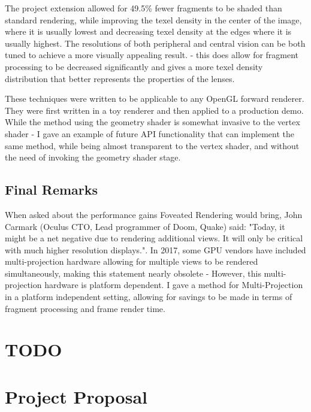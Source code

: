 \documentclass[12pt,a4paper,twoside,openright]{report}
\begin{document}
The project extension allowed for 49.5\% fewer fragments to be shaded than standard rendering, while improving the texel density in the center of the image, where it is usually lowest and decreasing texel density at the edges where it is usually highest. The resolutions of both peripheral and central vision can be both tuned to achieve a more visually appealing result. - this does allow for fragment processing to be decreased significantly and gives a more texel density distribution that better represents the properties of the lenses. \par

These techniques were written to be applicable to any OpenGL forward renderer. They were first written in a toy renderer and then applied to a production demo.
While the method using the geometry shader is somewhat invasive to the vertex shader - I gave an example of future API functionality that can implement the same method, while being almost transparent to the vertex shader, and without the need of invoking the geometry shader stage.

\section{Final Remarks}

When asked about the performance gains Foveated Rendering would bring, John Carmark (Oculus CTO, Lead programmer of Doom, Quake) said: "Today, it might be a net negative due to rendering additional views. It will only be critical with much higher resolution displays.". In 2017, some GPU vendors have included multi-projection hardware allowing for multiple views to be rendered simultaneously, making this statement nearly obsolete - However, this multi-projection hardware is platform dependent. I gave a method for Multi-Projection in a platform independent setting, allowing for savings to be made in terms of fragment processing and frame render time.



\appendix
\chapter{TODO}

\chapter{Project Proposal}


\end{document}
